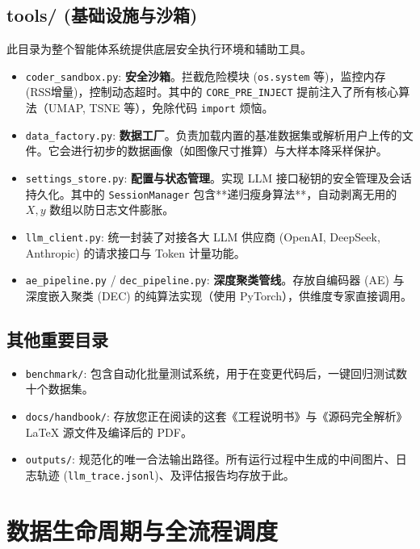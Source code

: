 \documentclass[12pt,a4paper]{article}
\begin{document}
\subsection{tools/ (基础设施与沙箱)}
此目录为整个智能体系统提供底层安全执行环境和辅助工具。
\begin{itemize}[nosep]
    \item \texttt{coder\_sandbox.py}: \textbf{安全沙箱}。拦截危险模块 (\texttt{os.system} 等)，监控内存 (RSS增量)，控制动态超时。其中的 \texttt{CORE\_PRE\_INJECT} 提前注入了所有核心算法（UMAP, TSNE 等），免除代码 \texttt{import} 烦恼。
    \item \texttt{data\_factory.py}: \textbf{数据工厂}。负责加载内置的基准数据集或解析用户上传的文件。它会进行初步的数据画像（如图像尺寸推算）与大样本降采样保护。
    \item \texttt{settings\_store.py}: \textbf{配置与状态管理}。实现 LLM 接口秘钥的安全管理及会话持久化。其中的 \texttt{SessionManager} 包含**递归瘦身算法**，自动剥离无用的 $X, y$ 数组以防日志文件膨胀。
    \item \texttt{llm\_client.py}: 统一封装了对接各大 LLM 供应商 (OpenAI, DeepSeek, Anthropic) 的请求接口与 Token 计量功能。
    \item \texttt{ae\_pipeline.py} / \texttt{dec\_pipeline.py}: \textbf{深度聚类管线}。存放自编码器 (AE) 与深度嵌入聚类 (DEC) 的纯算法实现（使用 PyTorch），供维度专家直接调用。
\end{itemize}

\subsection{其他重要目录}
\begin{itemize}[nosep]
    \item \texttt{benchmark/}: 包含自动化批量测试系统，用于在变更代码后，一键回归测试数十个数据集。
    \item \texttt{docs/handbook/}: 存放您正在阅读的这套《工程说明书》与《源码完全解析》LaTeX 源文件及编译后的 PDF。
    \item \texttt{outputs/}: 规范化的唯一合法输出路径。所有运行过程中生成的中间图片、日志轨迹 (\texttt{llm\_trace.jsonl})、及评估报告均存放于此。
\end{itemize}

\newpage

\newpage

\section{数据生命周期与全流程调度}
\end{document}
